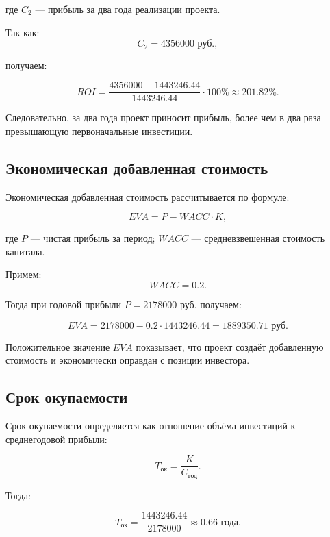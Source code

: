 где $C_2$ --- прибыль за два года реализации проекта.

Так как:
\[
C_2 = 4356000 \text{ руб.},
\]

получаем:

\begin{equation}
ROI = \frac{4356000 - 1443246.44}{1443246.44}\cdot 100\%
\approx 201.82\%.
\end{equation}

Следовательно, за два года проект приносит прибыль, более чем в два
раза превышающую первоначальные инвестиции.

\subsection*{Экономическая добавленная стоимость}

Экономическая добавленная стоимость рассчитывается по формуле:

\begin{equation}
EVA = P - WACC \cdot K,
\end{equation}

где $P$ --- чистая прибыль за период; $WACC$ ---
средневзвешенная стоимость капитала.

Примем:
\[
WACC = 0.2.
\]

Тогда при годовой прибыли $P = 2178000$ руб. получаем:

\begin{equation}
EVA = 2178000 - 0.2 \cdot 1443246.44 =
1889350.71 \text{ руб.}
\end{equation}

Положительное значение $EVA$ показывает, что проект создаёт
добавленную стоимость и экономически оправдан с позиции инвестора.

\subsection*{Срок окупаемости}

Срок окупаемости определяется как отношение объёма инвестиций к
среднегодовой прибыли:

\begin{equation}
T_{\text{ок}} = \frac{K}{C_{\text{год}}}.
\end{equation}

Тогда:

\begin{equation}
T_{\text{ок}} = \frac{1443246.44}{2178000} \approx 0.66 \text{ года}.
\end{equation}

